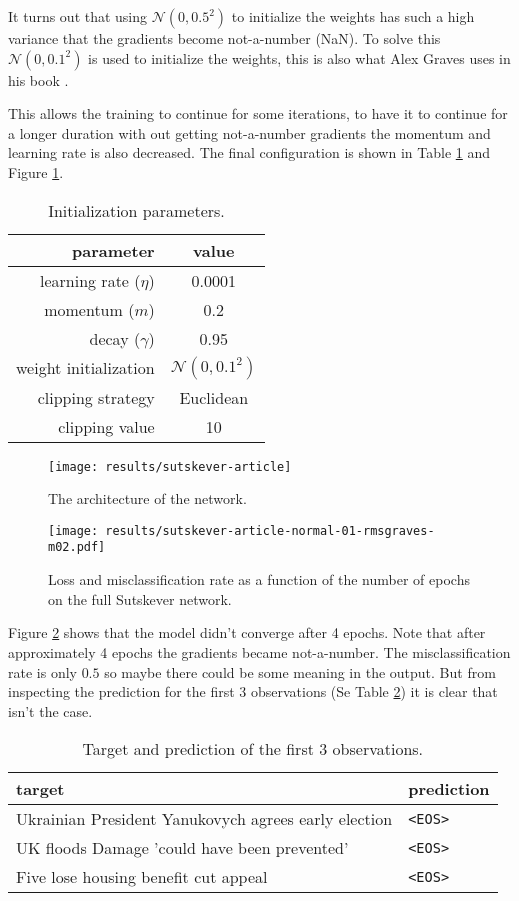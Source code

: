 It turns out that using $\mathcal{N}(0, 0.5^2)$ to initialize the weights has such a high variance that the gradients become not-a-number (NaN). To solve this $\mathcal{N}(0, 0.1^2)$ is used to initialize the weights, this is also what Alex Graves uses in his book \cite{alexgraves}.

This allows the training to continue for some iterations, to have it to continue for a longer duration with out getting not-a-number gradients the momentum and learning rate is also decreased. The final configuration is shown in Table \ref{fig:results:sutskever:article-parameters} and Figure \ref{fig:results:sutskever:article-artitecture}.
\begin{table}[h]
\centering
\begin{tabular}{r|c}
	parameter & value \\ \hline
	learning rate ($\eta$) & 0.0001 \\
	momentum ($m$) & 0.2 \\
	decay ($\gamma$) & 0.95 \\
	weight initialization & $\mathcal{N}(0, 0.1^2)$ \\
	clipping strategy & Euclidean \\
	clipping value & 10
\end{tabular}
\caption{Initialization parameters.}
\label{fig:results:sutskever:article-parameters}
\end{table}

\begin{figure}[h]
	\centering
	\texttt{[image: results/sutskever-article]}
	\caption{The architecture of the network.}
	\label{fig:results:sutskever:article-artitecture}
\end{figure}

\begin{figure}[H]
	\centering
	\texttt{[image: results/sutskever-article-normal-01-rmsgraves-m02.pdf]}
	\caption{Loss and misclassification rate as a function of the number of epochs on the full Sutskever network.}
	\label{fig:results:sutskever:article-learning}
\end{figure}

Figure \ref{fig:results:sutskever:article-learning} shows that the model didn't converge after 4 epochs. Note that after approximately 4 epochs the gradients became not-a-number. The misclassification rate is only $0.5$ so maybe there could be some meaning in the output. But from inspecting the prediction for the first 3 observations (Se Table \ref{fig:results:sutskever:predictions}) it is clear that isn't the case.
\begin{table}[h]
\centering
\begin{tabular}{p{9cm}|p{2cm}}
	target & prediction \\ \hline
	Ukrainian President Yanukovych agrees early election & \texttt{<EOS>} \\
	UK floods Damage 'could have been prevented' & \texttt{<EOS>} \\
	Five lose housing benefit cut appeal & \texttt{<EOS>}
\end{tabular}
\caption{Target and prediction of the first 3 observations.}
\label{fig:results:sutskever:predictions}
\end{table}

